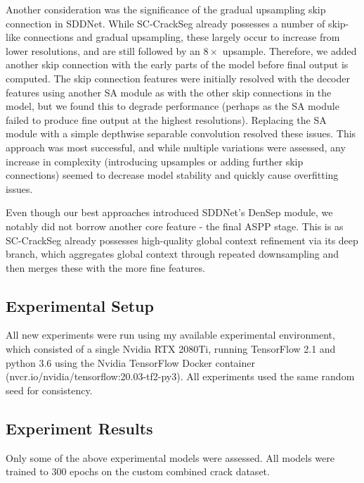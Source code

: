 \documentclass[a4paper,12pt]{report}
\begin{document}
Another consideration was the significance of the gradual upsampling skip connection in SDDNet. While SC-CrackSeg already possesses a number of skip-like connections and gradual upsampling, these largely occur to increase from lower resolutions, and are still followed by an $8 \times$ upsample. Therefore, we added another skip connection with the early parts of the model before final output is computed. The skip connection features were initially resolved with the decoder features using another SA module as with the other skip connections in the model, but we found this to degrade performance (perhaps as the SA module failed to produce fine output at the highest resolutions). Replacing the SA module with a simple depthwise separable convolution resolved these issues. This approach was most successful, and while multiple variations were assessed, any increase in complexity (introducing upsamples or adding further skip connections) seemed to decrease model stability and quickly cause overfitting issues.



Even though our best approaches introduced SDDNet's DenSep module, we notably did not borrow another core feature - the final ASPP stage. This is as SC-CrackSeg already possesses high-quality global context refinement via its deep branch, which aggregates global context through repeated downsampling and then merges these with the more fine features.

\subsection{Experimental Setup}
All new experiments were run using my available experimental environment, which consisted of a single Nvidia RTX 2080Ti, running TensorFlow 2.1 and python 3.6 using the Nvidia TensorFlow Docker container (nvcr.io/nvidia/tensorflow:20.03-tf2-py3). All experiments used the same random seed for consistency.

\subsection{Experiment Results}


Only some of the above experimental models were assessed. All models were trained to 300 epochs on the custom combined crack dataset.
\end{document}
